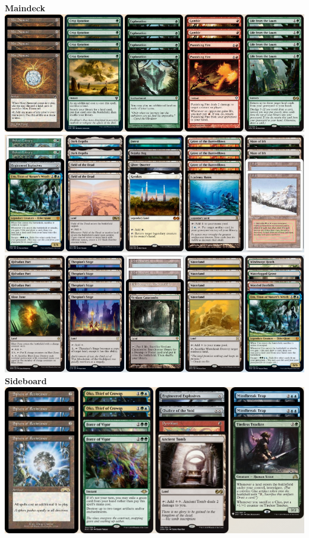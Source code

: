 \documentclass{report}
\begin{document}
\begin{center}
\textbf{Maindeck\\}
\includegraphics [width =\textwidth] {ruglands1}
\includegraphics [width =\textwidth] {ruglands2}
\includegraphics [width =\textwidth] {ruglands3}
\textbf{Sideboard\\}
\includegraphics [width =\textwidth] {ruglandssb}
\end{center}
\end{document}
